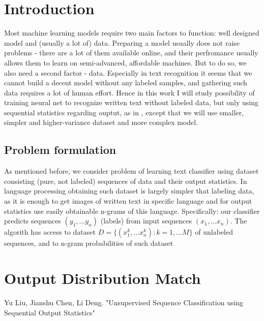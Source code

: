 \documentclass[shortabstract]{iithesis}
\author         {Grzegorz Ciesielski}
\begin{document}

\chapter{Introduction}

Most machine learning models require two main factors to function: well 
designed model and (usually a lot of) data. Preparing a model usually does not
raise problems - there are a lot of them available online, and their perfromance
usually allows them to learn on semi-advanced, affordable machines. But to do so,
we also need a second factor - data. Especially in text recognition 
it seems that we cannot build a decent model without any labeled samples, and
gathering such data requires a lot of human effort. Hence in this work I will study 
possibility of training neural net to recognize written text without labeled data, 
but only using sequential statistics regarding ouptut, as in \cite{main_paper}, 
except that we will use smaller, simpler and higher-variance dataset and more 
complex model.

\section{Problem formulation}

As mentioned before, we consider problem of learning text classifier using dataset
consisting (pure, not labeled) sequences of data and their output statistics. In 
language processing obtaining such dataset is largely simpler that labeling data,
as it is enough to get images of written text in specific language and for output 
statistics use easily obtainable n-grams of this language. Specifically: our classifier
predicts sequences $(y_1, \dots y_n)$ (labels) from input sequences $(x_1, \dots x_n)$. The 
algorith has access to dataset $D = \lbrace (x_1^k, \dots x_n^k) : k = 1, \dots M \rbrace$ of
unlabeled sequences, and to n-gram probabilities of such dataset 



\chapter{Output Distribution Match}


\begin{thebibliography}{1}
 Yu Liu, Jianshu Chen, Li Deng. "Unsupervised Sequence Classification using
Sequential Output Statistics"

\end{thebibliography}
\end{document}
